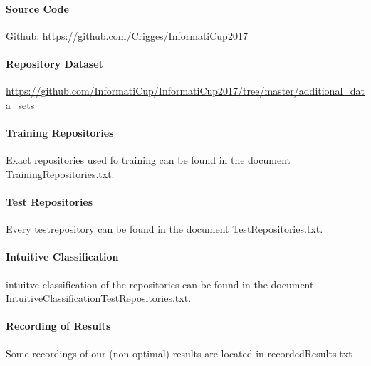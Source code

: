 \documentclass[paper=A4,pagesize=auto,12pt,headinclude=true,footinclude=true,BCOR=0mm,DIV=calc]{scrartcl}
\begin{document}
	\paragraph{Source Code}
	Github: \url{https://github.com/Crigges/InformatiCup2017}\\
	\paragraph{Repository Dataset}
	\label{src:Repositories}
	\url{https://github.com/InformatiCup/InformatiCup2017/tree/master/additional_data_sets}	\\
	
	\label{src:TrainingRepositories}
	\paragraph{Training Repositories}
	Exact repositories used fo training can be found in the document TrainingRepositories.txt.
	
	\label{src:TestRepositories}
	\paragraph{Test Repositories}
	Every testrepository can be found in the document TestRepositories.txt.
	\paragraph{Intuitive Classification}
	\label{src:ClassifyTestRepositories}
	intuitve classification of the repositories can be found in the document IntuitiveClassificationTestRepositories.txt.
	
	\label{src:recordingsOfResults}
	\paragraph{Recording of Results}
	Some recordings of our (non optimal) results are located in recordedResults.txt
	
	
\end{document}
